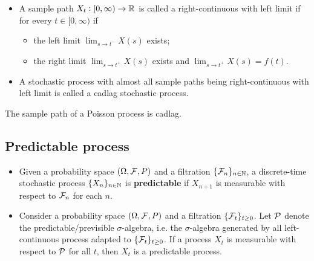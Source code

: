 \begin{refsection}
\begin{definition}\hfill
	\begin{itemize}
		\item A sample path $X_t: [0,\infty) \to \mathbb{R}$ is called a right-continuous with left limit if for every $t\in [0,\infty)$ if
		\begin{itemize}
			\item the left limit $\lim_{s\to t^-} X(s)$ exists;
			\item the right limit $\lim_{s\to t^+ }X(s)$ exists and $\lim_{s\to t^+ }X(s) = f(t)$.
		\end{itemize}
		\item A stochastic process with almost all sample paths being right-continuous with left limit is called a cadlag stochastic process.
	\end{itemize}
\end{definition}

\begin{example}
	The sample path of a Poisson process is cadlag.	
\end{example}

\subsection{Predictable process}

\begin{definition}\hfill
\begin{itemize}
	\item Given a probability space $(\Omega, \mathcal{F}, P)$ and a filtration $\{\mathcal{F}_n\}_{n\in \mathbb{N}}$, a discrete-time stochastic process $\{X_n\}_{n\in \mathbb{N}}$ is \textbf{predictable} if $X_{n+1}$ is measurable with respect to $\mathcal{F}_n$ for each $n$.
	\item  Consider a probability space $(\Omega, \mathcal{F}, P)$ and a filtration $\{\mathcal{F}_t\}_{t\geq 0}$. Let $\mathcal{P}$ denote the predictable/previsible $\sigma$-algebra, i.e. the $\sigma$-algebra generated by all left-continuous process adapted to $\{\mathcal{F}_t\}_{t\geq 0}$. If a process $X_{t}$ is measurable with respect to $\mathcal{P}$ for all $t$, then $X_t$ is a predictable process.
\end{itemize}	
\end{definition}



\end{refsection}
